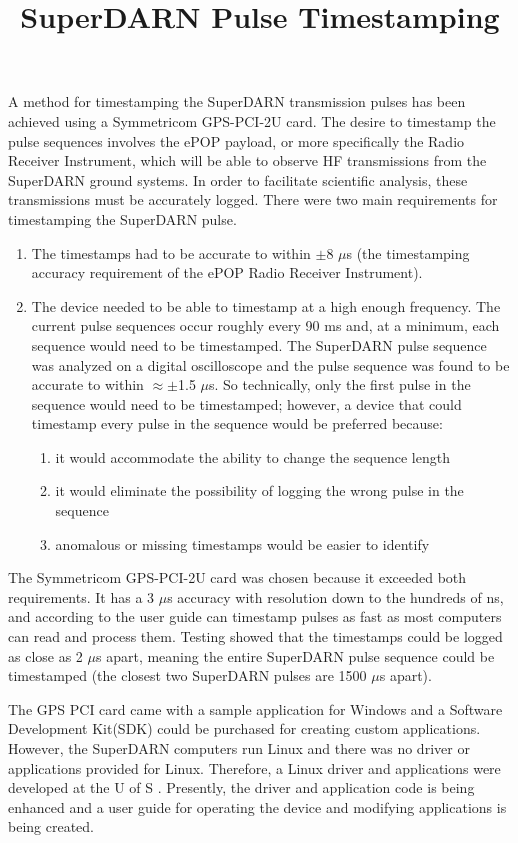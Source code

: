 \documentclass[11pt]{article}
\title{SuperDARN Pulse Timestamping}
\begin{document}
    \maketitle

    A method for timestamping the SuperDARN transmission pulses has been achieved using a Symmetricom GPS-PCI-2U card.
    The desire to timestamp the pulse sequences involves the ePOP payload, or more specifically the Radio Receiver Instrument,
    which will be able to observe HF transmissions from the SuperDARN ground systems.
    In order to facilitate scientific analysis, these transmissions must be accurately logged.
    There were two main requirements for timestamping the SuperDARN pulse.
    \begin{enumerate}
        \item The timestamps had to be accurate to within $\pm$8 $\mu$s (the timestamping accuracy requirement of the ePOP Radio Receiver Instrument).
        \item The device needed to be able to timestamp at a high enough frequency.
        The current pulse sequences occur roughly every 90 ms and, at a minimum, each sequence would need to be timestamped.
        The SuperDARN pulse sequence was analyzed on a digital oscilloscope and the pulse sequence was found to be accurate to within $\approx \pm$1.5 $\mu$s.
        So technically, only the first pulse in the sequence would need to be timestamped;
        however, a device that could timestamp every pulse in the sequence would be preferred because:
        \begin{enumerate}
            \item it would accommodate the ability to change the sequence length
            \item it would eliminate the possibility of logging the wrong pulse in the sequence
            \item anomalous or missing timestamps would be easier to identify
        \end{enumerate}
    \end{enumerate}

    The Symmetricom GPS-PCI-2U card was chosen because it exceeded both requirements.
    It has a 3 $\mu$s accuracy with resolution down to the hundreds of ns, and according to the user guide can
    timestamp pulses as fast as most computers can read and process them.
    Testing showed that the timestamps could be logged as close as 2 $\mu$s apart,
    meaning the entire SuperDARN pulse sequence could be timestamped (the closest two SuperDARN pulses are 1500 $\mu$s apart).

    The GPS PCI card came with a sample application for Windows and a Software Development Kit(SDK) could
    be purchased for creating custom applications.
    However, the SuperDARN computers run Linux and there was no driver or applications provided for Linux.
    Therefore, a Linux driver and applications were developed at the U of S .
    Presently, the driver and application code is being enhanced and a user guide for operating the device and modifying applications is being created.
\end{document}
